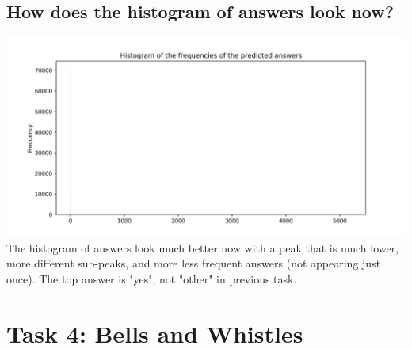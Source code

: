 \documentclass{article}
\begin{document}
\subsection{How does the histogram of answers look now?}
\includegraphics[width=\textwidth]{q3.3.png}
The histogram of answers look much better now with a peak that is much lower, more different sub-peaks, and more less frequent answers (not appearing just once). The top answer is "yes", not "other" in previous task.
\newpage

\setcounter{section}{4}
\section*{Task 4: Bells and Whistles}

\setcounter{subsection}{0}
\end{document}
